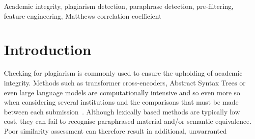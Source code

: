 \documentclass[conference]{IEEEtran}
\begin{document}
\begin{abstract}
Large-scale academic integrity detection requires a balance between
reliable similarity assessment and computational efficiency. Lexical
methods are inexpensive but may miss paraphrased content, whereas
richer feature-based models require greater computation. This paper
presents a typed-decision pre-filtering approach that uses a lightweight
similarity model to identify straightforward cases and reserves a
comprehensive feature-based model for cases requiring further review.
The proposed feature representation extends an eight-feature baseline
with word-overlap, character n-gram, edit-distance, semantic, structural,
and phonetic features. The approach is evaluated on a text-plagiarism
benchmark (Dataset 1) and Quora Question Pairs (Dataset 2) using Matthews
Correlation Coefficient (MCC), accuracy, ROC-AUC, and inference latency. The complete
83-feature model improves MCC over the baseline from 0.3573 to 0.4705
on Dataset 1 and from 0.1990 to 0.3958 on Dataset 2. The lightweight baseline is faster
by factors of 2.8 and 20.7, respectively. These findings motivate a
two-stage architecture; however, end-to-end cascade performance remains
to be validated experimentally.
\end{abstract}

\begin{IEEEkeywords}
Academic integrity, plagiarism detection, paraphrase detection,
pre-filtering, feature engineering, Matthews correlation coefficient
\end{IEEEkeywords}


\section{Introduction}

Checking for plagiarism is commonly used to ensure the upholding of
academic integrity. Methods such as transformer cross-encoders,
Abstract Syntax Trees or even large language models are computationally
intensive and so even more so when considering several institutions and
the comparisons that must be made between each submission~\cite{reimers2019}.
Although lexically based methods are typically low cost, they can fail
to recognise paraphrased material and/or semantic equivalence. Poor
similarity assessment can therefore result in additional, unwarranted
\end{document}
